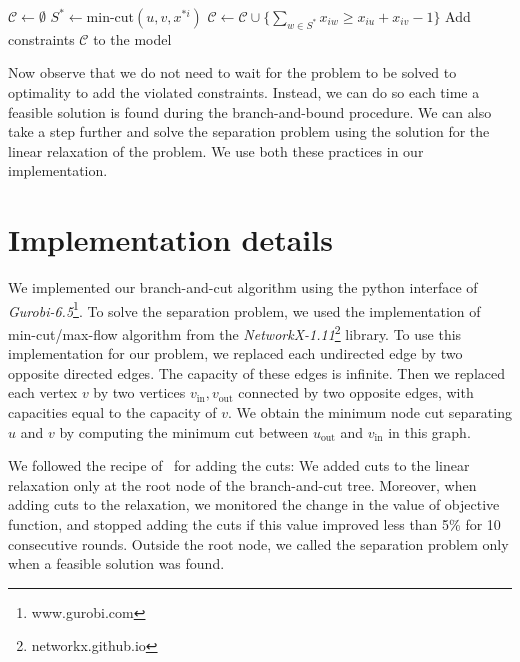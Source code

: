 \documentclass[]{article}
\begin{document}
\begin{algorithm}
\begin{algorithmic}
\State $\mathcal{C} \gets \emptyset$
		\State $S^* \gets \text{min-cut}(u, v, x^{*i})$
			\State $\mathcal{C} \gets \mathcal{C} \cup \{\sum_{w \in S^*} x_{iw} \geq x_{iu} + x_{iv} - 1\}$
		\EndIf
	\EndFor
\EndFor
\State Add constraints $\mathcal{C}$ to the model
\end{algorithmic}
\end{algorithm}

Now observe that we do not need to wait for the problem to be solved to
optimality to add the violated constraints. Instead, we can do so each
time a feasible solution is found during the branch-and-bound procedure.
We can also take a step further and solve the separation problem using
the solution for the linear relaxation of the problem. We use both these
practices in our implementation.

\section{Implementation details}
\label{sec:implementation}

We implemented our branch-and-cut algorithm using the python interface
of \emph{Gurobi-6.5}\footnote{www.gurobi.com}. To solve the separation problem, we used the
implementation of min-cut/max-flow algorithm from the \emph{NetworkX-1.11}\footnote{networkx.github.io} library. To use this implementation for our problem, we replaced
each undirected edge by two opposite directed edges. The capacity of
these edges is infinite. Then we replaced each vertex $v$ by two
vertices $v_{\text{in}}, v_{\text{out}}$ connected by two opposite
edges, with capacities equal to the capacity of $v$. We obtain the
minimum node cut separating $u$ and $v$ by computing the minimum cut
between $u_{\text{out}}$ and $v_{\text{in}}$ in this graph.

We followed the recipe of~\citet{CarvajalCGVW13} for adding the cuts: We added cuts to the
linear relaxation only at the root node of the branch-and-cut tree.
Moreover, when adding cuts to the relaxation, we monitored the change in
the value of objective function, and stopped adding the cuts if this
value improved less than 5\% for 10 consecutive rounds. Outside the root
node, we called the separation problem only when a feasible solution was
found.



\end{document}
